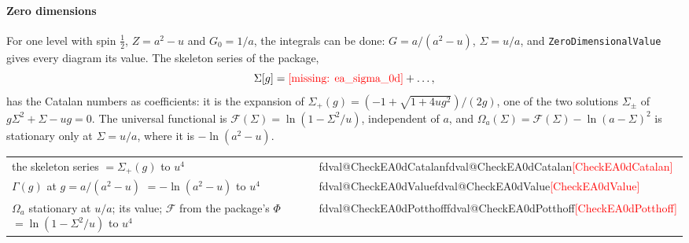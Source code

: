 \documentclass[11pt,a4paper]{article}
\makeatletter
\newcommand{\formula}[1]{\IfFileExists{figures/formula_#1.tex}{}{\text{\textcolor{red}{[missing: \detokenize{#1}]}}}}
\newcommand{\pkg}[1]{\texttt{#1}}
\newcommand{\val}[1]{\ifcsname fdval@#1\endcsname\csname fdval@#1\endcsname\else\textcolor{red}{[#1]}\fi}
\makeatother
\begin{document}
\paragraph{Zero dimensions} For one level with spin $\frac12$, $Z=a^2-u$ and $G_0=1/a$, the integrals can be done:
$G=a/(a^2-u)$, $\Sigma=u/a$, and \pkg{ZeroDimensionalValue} gives every diagram its value. The skeleton series of the
package,
\[
\Sigma[g]=\formula{ea_sigma_0d}+\dots,
\]
has the Catalan numbers as coefficients: it is the expansion of $\Sigma_+(g)=(-1+\sqrt{1+4ug^2})/(2g)$, one of the two
solutions $\Sigma_\pm$ of $g\Sigma^2+\Sigma-ug=0$. The universal functional is $\mathcal F(\Sigma)=\ln(1-\Sigma^2/u)$, independent of
$a$, and $\Omega_a(\Sigma)=\mathcal F(\Sigma)-\ln(a-\Sigma)^2$ is stationary only at $\Sigma=u/a$, where it is $-\ln(a^2-u)$.
\begin{result}
\begin{tabular}{@{}l@{\quad}l@{}}
the skeleton series $=\Sigma_+(g)$ to $u^4$ & \val{CheckEA0dCatalan}\\
$\Gamma(g)$ at $g=a/(a^2-u)$ $=-\ln(a^2-u)$ to $u^4$ & \val{CheckEA0dValue}\\
$\Omega_a$ stationary at $u/a$; its value; $\mathcal F$ from the package's $\Phi$ $=\ln(1-\Sigma^2/u)$ to $u^4$ & \val{CheckEA0dPotthoff}
\end{tabular}
\end{result}
\end{document}
